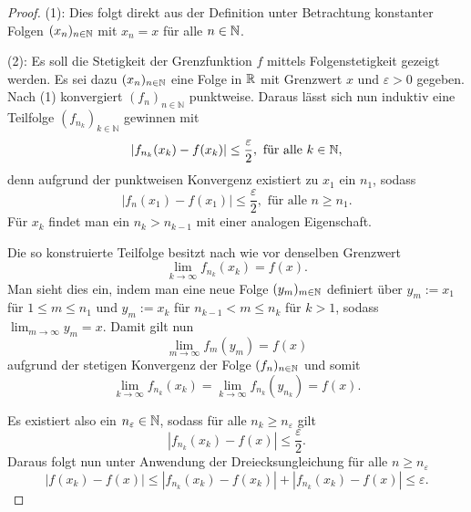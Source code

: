 \begin{proof}
  (1): 
  Dies folgt direkt aus der Definition unter Betrachtung konstanter Folgen $(x_n)_{n \in \mathbb{N}}$ mit $x_n = x$ für alle $n \in \mathbb{N}$.

  (2): 
  Es soll die Stetigkeit der Grenzfunktion $f$ mittels Folgenstetigkeit gezeigt werden. 
  Es sei dazu $(x_n)_{n \in \mathbb{N}}$ eine Folge in $\mathbb{R}$ mit Grenzwert $x$ und $\varepsilon > 0$ gegeben.
  Nach (1) konvergiert $(f_n)_{n \in \mathbb{N}}$ punktweise.
  Daraus lässt sich nun induktiv eine Teilfolge $(f_{n_k})_{k \in \mathbb{N}}$ gewinnen mit
  \begin{displaymath}
    | f_{n_k}(x_k) - f(x_k) | \leq \frac{\varepsilon}{2}, \text{ für alle $k \in \mathbb{N}$},
  \end{displaymath}
  denn aufgrund der punktweisen Konvergenz existiert zu $x_1$ ein $n_1$, sodass
  \begin{displaymath}
    | f_{n}(x_1) - f(x_1) | \leq \frac{\varepsilon}{2}, \text{ für alle $n \geq n_1$}.
  \end{displaymath}
  Für $x_k$ findet man ein $n_k > n_{k-1}$ mit einer analogen Eigenschaft.

  Die so konstruierte Teilfolge besitzt nach wie vor denselben Grenzwert
  \begin{displaymath}
    \lim_{k \to \infty} f_{n_k}(x_k) = f(x).
  \end{displaymath}
  Man sieht dies ein, indem man eine neue Folge $(y_m)_{m \in \mathbb{N}}$ definiert über $y_m:=x_1$ für $1 \leq m \leq n_1$ und $y_m:=x_k$ für $n_{k-1} < m \leq n_{k}$ für $k > 1$, sodass $\lim_{m \to \infty} y_m = x$.
  Damit gilt nun
  \begin{displaymath}
    \lim_{m \to \infty} f_m(y_m) = f(x)
  \end{displaymath}
  aufgrund der stetigen Konvergenz der Folge $(f_n)_{n \in \mathbb{N}}$ und somit
  \begin{displaymath}
    \lim_{k \to \infty} f_{n_k}(x_{k}) 
    = \lim_{k \to \infty} f_{n_k}(y_{n_k}) 
    = f(x).
  \end{displaymath} 

  Es existiert also ein $n_\varepsilon \in \mathbb{N}$, sodass für alle $n_k \geq n_\varepsilon$ gilt
  \begin{displaymath}
    | f_{n_k}(x_k) - f(x) | \leq \frac{\varepsilon}{2}.
  \end{displaymath}
  Daraus folgt nun unter Anwendung der Dreiecksungleichung für alle $n \geq n_\varepsilon$
  \begin{displaymath}
    | f(x_k) - f(x) |
    \leq
    | f_{n_k}(x_k) - f(x_k) | + | f_{n_k}(x_k) - f(x) | 
    \leq \varepsilon.
  \end{displaymath}


\end{proof}

